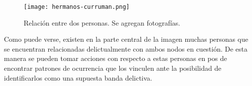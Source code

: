 \begin{figure}
	\centering
	\texttt{[image: hermanos-curruman.png]}
	\caption{Relación entre dos personas. Se agregan fotografías.} 
	\label{fig:hermanos-curruman}
\end{figure}

Como puede verse, existen en la parte central de la imagen muchas personas que se encuentran relacionadas delictualmente con ambos nodos en cuestión. De esta manera se pueden tomar acciones con respecto a estas personas en pos de encontrar patrones de ocurrencia que los vinculen ante la posibilidad de identificarlos como una supuesta banda delictiva. 